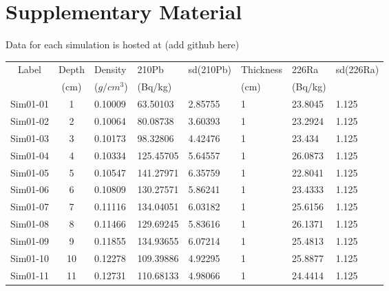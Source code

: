 \documentclass [10pt] {article}
\begin{document}


\newpage


\section{Supplementary Material}
\label{sec:supp_mat}
Data for each simulation is hosted at (add github here)
\newpage
\begin{table}[H]
	\begin{tabular}{c|cllllll}
		Label    & Depth & Density  & 210Pb & sd(210Pb) & Thickness& 226Ra  & sd(226Ra) \\
		& (cm) &($g/cm^3$) &(Bq/kg)& & (cm) & (Bq/kg)&\\
		\hline 
		Sim01-01 & 1          & 0.10009                         & 63.50103      & 2.85755   & 1              & 23.8045       & 1.125     \\
		Sim01-02 & 2          & 0.10064                         & 80.08738      & 3.60393   & 1              & 23.2924       & 1.125     \\
		Sim01-03 & 3          & 0.10173                         & 98.32806      & 4.42476   & 1              & 23.434        & 1.125     \\
		Sim01-04 & 4          & 0.10334                         & 125.45705     & 5.64557   & 1              & 26.0873       & 1.125     \\
		Sim01-05 & 5          & 0.10547                         & 141.27971     & 6.35759   & 1              & 22.8041       & 1.125     \\
		Sim01-06 & 6          & 0.10809                         & 130.27571     & 5.86241   & 1              & 23.4333       & 1.125     \\
		Sim01-07 & 7          & 0.11116                         & 134.04051     & 6.03182   & 1              & 25.6156       & 1.125     \\
		Sim01-08 & 8          & 0.11466                         & 129.69245     & 5.83616   & 1              & 26.1371       & 1.125     \\
		Sim01-09 & 9          & 0.11855                         & 134.93655     & 6.07214   & 1              & 25.4813       & 1.125     \\
		Sim01-10 & 10         & 0.12278                         & 109.39886     & 4.92295   & 1              & 25.8877       & 1.125     \\
		Sim01-11 & 11         & 0.12731                         & 110.68133     & 4.98066   & 1              & 24.4414       & 1.125     \\

\end{tabular}
\end{table}
\end{document}
